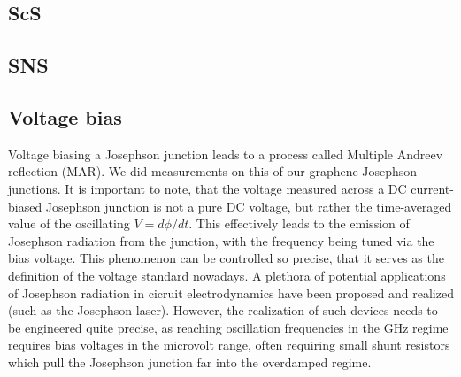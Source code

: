 \subsection{ScS}


\subsection{SNS}

\subsection{Voltage bias}
Voltage biasing a Josephson junction leads to a process called Multiple Andreev reflection (MAR).
We did measurements on this of our graphene Josephson junctions.
It is important to note, that the voltage measured across a DC current-biased Josephson junction is not a pure DC voltage, but rather the time-averaged value of the oscillating $V=d\phi/dt$.
This effectively leads to the emission of Josephson radiation from the junction, with the frequency being tuned via the bias voltage.
This phenomenon can be controlled so precise, that it serves as the definition of the voltage standard nowadays.
A plethora of potential applications of Josephson radiation in cicruit electrodynamics have been proposed and realized (such as the Josephson laser).
However, the realization of such devices needs to be engineered quite precise, as reaching oscillation frequencies in the GHz regime requires bias voltages in the microvolt range, often requiring small shunt resistors which pull the Josephson junction far into the overdamped regime.